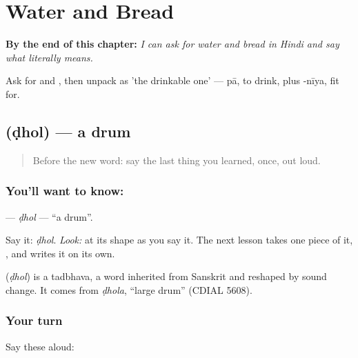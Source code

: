 
\chapter{Water and Bread}
\label{ch:hi-water-and-bread}

\begin{chapteropening}
\textbf{By the end of this chapter:} \emph{I can ask for water and bread in Hindi and say what  literally means.}

Ask for  and , then unpack  as 'the drinkable one' — pā, to drink, plus -nīya, fit for.
\end{chapteropening}

\section[\texorpdfstring{\hi{ढोल} (ḍhol)}{ढोल (ḍhol)}]{ (ḍhol) — a drum}

\label{lesson:HI-C15-dhol}



\begin{quote}
Before the new word: say the last thing you learned, once, out loud.
\end{quote}

\subsection*{You'll want to know: }
\textbf{} — \emph{ḍhol} — \textquotedblleft{}a drum\textquotedblright{}.

Say it: \emph{ḍhol}. \emph{Look:} at its shape as you say it. The next lesson takes one piece of it, \textbf{}, and writes it on its own.

\begin{cousinweb}
\textbf{} (\emph{ḍhol}) is a tadbhava, a word inherited from Sanskrit and reshaped by sound change. It comes from \emph{ḍhola}, \textquotedblleft{}large drum\textquotedblright{} (CDIAL 5608).
\end{cousinweb}

\subsection*{Your turn}
Say these aloud:


